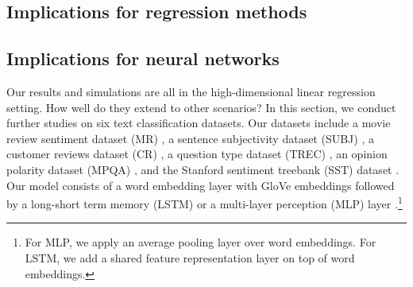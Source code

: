 
\subsection{Implications for regression methods}


\subsection{Implications for neural networks}
Our results and simulations are all in the high-dimensional linear regression setting.
How well do they extend to other scenarios?
In this section, we conduct further studies on six text classification datasets.
Our datasets include a movie review sentiment dataset (MR) \cite{pang2005seeing}, a sentence subjectivity dataset (SUBJ) \cite{pang2004sentimental}, a customer reviews dataset (CR) \cite{hu2004mining}, a question type dataset (TREC) \cite{li2002learning}, an opinion polarity dataset (MPQA) \cite{wiebe2005annotating}, and the Stanford sentiment treebank (SST) dataset \cite{socher2013recursive}.
Our model consists of a word embedding layer with GloVe embeddings \cite{pennington2014glove} followed by a long-short term memory (LSTM) or a multi-layer perception (MLP) layer \cite{lei2018simple}.\footnote{For MLP, we apply an average pooling layer over word embeddings.
For LSTM, we add a shared feature representation layer on top of word embeddings.}


